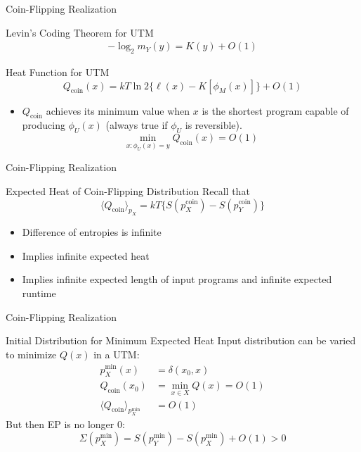 \documentclass{beamer}
\begin{document}
\begin{frame}{Coin-Flipping Realization}
    \begin{block}{Levin's Coding Theorem for UTM}
    \begin{align*}
        -\log_2 m_Y(y) = K(y) + O(1)
    \end{align*}
    \end{block}
    \begin{block}{Heat Function for UTM}
    \begin{equation*}
        Q_\text{coin}(x) = kT\ln 2 \{\ell(x) - K[\phi_M(x)]\} + O(1)
    \end{equation*}
    \begin{itemize}
        \item $Q_\text{coin}$ achieves its minimum value when $x$ is the shortest program capable of producing $\phi_U(x)$ (always true if $\phi_U$ is reversible).
        \begin{equation*}
            \min_{x:\phi_U(x)=y} Q_\text{coin}(x) = O(1)
        \end{equation*}
    \end{itemize}
    \end{block}
\end{frame}

\begin{frame}{Coin-Flipping Realization}
\begin{block}{Expected Heat of Coin-Flipping Distribution}
Recall that 
\begin{equation*}
    \langle Q_\text{coin}\rangle_{p_X} = kT\{ S(p_X^\text{coin}) - S(p_Y^\text{coin})\}
\end{equation*}
\begin{itemize}
    \item Difference of entropies is infinite
    \item Implies infinite expected heat
    \item Implies infinite expected length of input programs and infinite expected runtime
\end{itemize}
\end{block}
\end{frame}

\begin{frame}{Coin-Flipping Realization}
    \begin{block}{Initial Distribution for Minimum Expected Heat}
    Input distribution can be varied to minimize $Q(x)$ in a UTM:
    \begin{align*}
        p_X^\text{min} (x)&= \delta(x_0,x)\\
        Q_\text{coin}(x_0) &= \min_{x\in X} Q(x) = O(1)\\
        \langle Q_\text{coin}\rangle_{p_X^\text{min}} &= O(1)
    \end{align*}
    But then EP is no longer 0:
    \begin{equation*}
        \Sigma(p_X^\text{min}) = S(p_Y^\text{min}) - S(p_X^\text{min}) + O(1) > 0
    \end{equation*}
    \end{block}
\end{frame}
\end{document}
